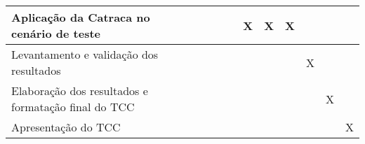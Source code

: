 \begin{table}[ht]
\begin{adjustbox}{width=\textwidth}
\begin{tabular}{|l|l|l|l|l|l|l|l|l|l|l|l|l|}
            Aplicação da Catraca no cenário de teste                                             &                        &                        &                        &                        &                        & \multicolumn{1}{c|}{}  & \multicolumn{1}{c|}{X} & \multicolumn{1}{c|}{X} & \multicolumn{1}{c|}{X} &                        &                        &                        \\ \hline
            Levantamento e validação dos resultados                                              &                        &                        &                        &                        &                        &                        &                        &                        &                        & \multicolumn{1}{c|}{X} &                        &                        \\ \hline
            Elaboração dos resultados e formatação final do   TCC                                &                        &                        &                        &                        &                        &                        &                        &                        &                        &                        & \multicolumn{1}{c|}{X} &                        \\ \hline
            Apresentação do TCC                                                                  &                        &                        &                        &                        &                        &                        &                        &                        &                        &                        &                        & \multicolumn{1}{c|}{X} \\ \hline
            \end{tabular}
    \end{adjustbox}
\end{table}
        
    
